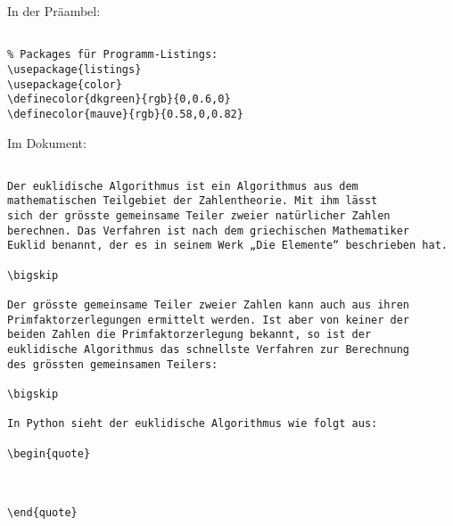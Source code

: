 
In der Präambel:

\begin{verbatim}

% Packages für Programm-Listings:
\usepackage{listings}
\usepackage{color}
\definecolor{dkgreen}{rgb}{0,0.6,0}
\definecolor{mauve}{rgb}{0.58,0,0.82}

\end{verbatim}

\tcblower

Im Dokument: 

\begin{verbatim}

Der euklidische Algorithmus ist ein Algorithmus aus dem 
mathematischen Teilgebiet der Zahlentheorie. Mit ihm lässt
sich der grösste gemeinsame Teiler zweier natürlicher Zahlen 
berechnen. Das Verfahren ist nach dem griechischen Mathematiker
Euklid benannt, der es in seinem Werk „Die Elemente“ beschrieben hat.

\bigskip 

Der grösste gemeinsame Teiler zweier Zahlen kann auch aus ihren 
Primfaktorzerlegungen ermittelt werden. Ist aber von keiner der 
beiden Zahlen die Primfaktorzerlegung bekannt, so ist der 
euklidische Algorithmus das schnellste Verfahren zur Berechnung 
des grössten gemeinsamen Teilers: 

\bigskip 

In Python sieht der euklidische Algorithmus wie folgt aus:

\begin{quote}



\end{quote}

\end{verbatim}
